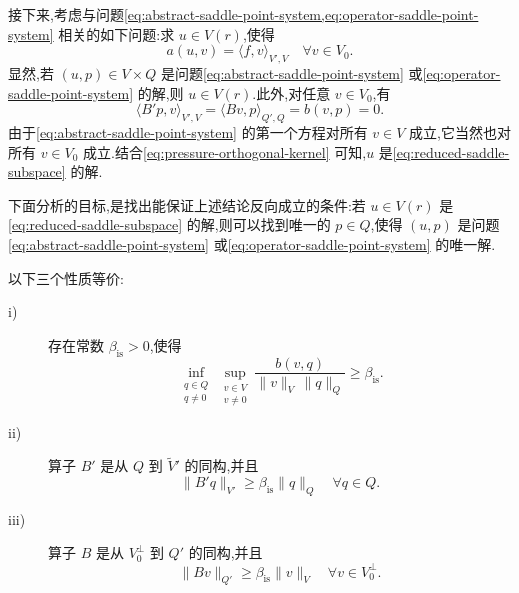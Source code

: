 \begin{note}[将系统化为子空间上的单个方程]\label{note:reduction-single-equation}
接下来,考虑与问题\cref{eq:abstract-saddle-point-system,eq:operator-saddle-point-system} 相关的如下问题:求 $u\in V(r)$,使得
\begin{equation}\label{eq:reduced-saddle-subspace}
  a(u,v)=\langle f,v\rangle_{V',V}\quad\forall v\in V_0.
\end{equation}
显然,若 $(u,p)\in V\times Q$ 是问题\cref{eq:abstract-saddle-point-system} 或\cref{eq:operator-saddle-point-system} 的解,则 $u\in V(r)$.此外,对任意 $v\in V_0$,有
\begin{equation}\label{eq:pressure-orthogonal-kernel}
  \langle B'p,v\rangle_{V',V}
  =\langle Bv,p\rangle_{Q',Q}
  =b(v,p)=0.
\end{equation}
由于\cref{eq:abstract-saddle-point-system} 的第一个方程对所有 $v\in V$ 成立,它当然也对所有 $v\in V_0$ 成立.结合\cref{eq:pressure-orthogonal-kernel} 可知,$u$ 是\cref{eq:reduced-saddle-subspace} 的解.

下面分析的目标,是找出能保证上述结论反向成立的条件:若 $u\in V(r)$ 是\cref{eq:reduced-saddle-subspace} 的解,则可以找到唯一的 $p\in Q$,使得 $(u,p)$ 是问题\cref{eq:abstract-saddle-point-system} 或\cref{eq:operator-saddle-point-system} 的唯一解.
\end{note}

\begin{lemma}\label{lem:inf-sup-condition}
以下三个性质等价:
\begin{description}
  \item[i)] 存在常数 $\beta_{\mathrm{is}}>0$,使得
  \begin{equation}\label{eq:infsup-condition}
    \inf_{\substack{q\in Q\\q\ne0}}
    \sup_{\substack{v\in V\\v\ne0}}
    \frac{b(v,q)}{\|v\|_V\,\|q\|_Q}\ge\beta_{\mathrm{is}}.
  \end{equation}
  \item[ii)] 算子 $B'$ 是从 $Q$ 到 $\widetilde{V}'$ 的同构,并且
  \begin{equation}\label{eq:infsup-adjoint-bound}
    \|B'q\|_{V'}\ge\beta_{\mathrm{is}}\|q\|_Q
    \quad\forall q\in Q.
  \end{equation}
  \item[iii)] 算子 $B$ 是从 $V_0^{\perp}$ 到 $Q'$ 的同构,并且
  \begin{equation}\label{eq:infsup-kernel-complement-bound}
    \|Bv\|_{Q'}\ge\beta_{\mathrm{is}}\|v\|_V
    \quad\forall v\in V_0^{\perp}.
  \end{equation}
\end{description}
\end{lemma}

